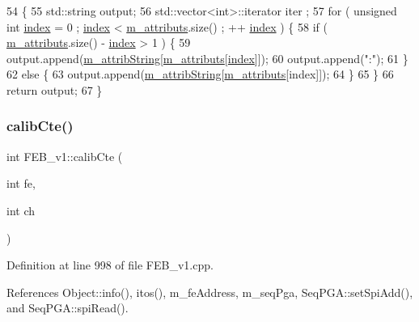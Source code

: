 \begin{DoxyCode}
54                             \{
55   std::string output;
56   std::vector<int>::iterator iter ;
57   \textcolor{keywordflow}{for} ( \textcolor{keywordtype}{unsigned} \textcolor{keywordtype}{int} \hyperlink{namespaceimages_a54407fd574970b3178647ae096321a57}{index} = 0 ; \hyperlink{namespaceimages_a54407fd574970b3178647ae096321a57}{index} < \hyperlink{classAttrib_ac4bd58a0cc6b38a3b711d609a3d3aacc}{m\_attributs}.size() ; ++
      \hyperlink{namespaceimages_a54407fd574970b3178647ae096321a57}{index} ) \{
58     \textcolor{keywordflow}{if} ( \hyperlink{classAttrib_ac4bd58a0cc6b38a3b711d609a3d3aacc}{m\_attributs}.size() - \hyperlink{namespaceimages_a54407fd574970b3178647ae096321a57}{index} > 1 ) \{
59       output.append(\hyperlink{classAttrib_a3414521d7a82476e874b25a5407b5e63}{m\_attribString}[\hyperlink{classAttrib_ac4bd58a0cc6b38a3b711d609a3d3aacc}{m\_attributs}[\hyperlink{namespaceimages_a54407fd574970b3178647ae096321a57}{index}]]);
60       output.append(\textcolor{stringliteral}{":"});
61     \}
62     \textcolor{keywordflow}{else} \{
63       output.append(\hyperlink{classAttrib_a3414521d7a82476e874b25a5407b5e63}{m\_attribString}[\hyperlink{classAttrib_ac4bd58a0cc6b38a3b711d609a3d3aacc}{m\_attributs}[index]]);
64     \}
65   \}
66   \textcolor{keywordflow}{return} output;
67 \}
\end{DoxyCode}
\mbox{\label{classFEB__v1_ad3893c8062c75d1f9695c196c95703c7}} 
\subsubsection{\texorpdfstring{calib\+Cte()}{calibCte()}}
{\footnotesize\ttfamily int F\+E\+B\+\_\+v1\+::calib\+Cte (\begin{DoxyParamCaption}\item[{int}]{fe,  }\item[{int}]{ch }\end{DoxyParamCaption})}



Definition at line 998 of file F\+E\+B\+\_\+v1.\+cpp.



References Object\+::info(), itos(), m\+\_\+fe\+Address, m\+\_\+seq\+Pga, Seq\+P\+G\+A\+::set\+Spi\+Add(), and Seq\+P\+G\+A\+::spi\+Read().



